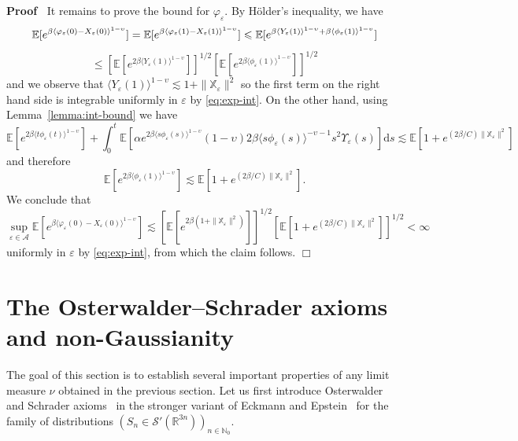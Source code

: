 \documentclass[a4paper,11pt]{article}
\newcommand{\mathd}{\mathrm{d}}
\newcommand{\tmcolor}[2]{{\color{#1}{#2}}}
\newenvironment{proof}{\noindent\textbf{Proof\ }}{\hspace*{\fill}$\Box$\medskip}
\numberwithin{equation}{section}
\begin{document}
\begin{proof}
  It remains to prove the bound for $\varphi_{\varepsilon}$. By H{\"o}lder's inequality, we have
  \[ \mathbb{E} [e^{\beta \langle \varphi_{\varepsilon} (0) - X_{\varepsilon}
     (0) \rangle^{1 - \upsilon}}] =\mathbb{E} [e^{\beta \langle
     \varphi_{\varepsilon} (1) - X_{\varepsilon} (1) \rangle^{1 - \upsilon}}]
     \leqslant \mathbb{E} [e^{ \beta \tmcolor{red}{} \langle Y_{\varepsilon}
     (1) \rangle^{1 - \upsilon} +  \beta \tmcolor{red}{} \langle
     \phi_{\varepsilon} (1) \rangle^{1 - \upsilon}}] \]
  \[ \leqslant [\mathbb{E} [e^{2  \beta \langle Y_{\varepsilon} (1)
     \rangle^{1 - \upsilon}}]]^{1 / 2} [\mathbb{E} [e^{2 \beta  \langle
     \phi_{\varepsilon} (1) \rangle^{1 - \upsilon}}]]^{1 / 2} \]
  and we observe that $\langle Y_{\varepsilon} (1) \rangle^{1 - \upsilon}
  \lesssim 1 + \| \mathbb{X}_{\varepsilon} \|^2$ so the first term on the
  right hand side is integrable uniformly in $\varepsilon$ by {\eqref{eq:exp-int}}. On
  the other hand, using Lemma~\ref{lemma:int-bound} we have
  \[ \mathbb{E} [e^{2  \beta \langle t \phi_{\varepsilon} (t) \rangle^{1 -
     \upsilon}}] + \int_0^t \mathbb{E} [\alpha e^{2  \beta \langle s
     \phi_{\varepsilon} (s) \rangle^{1 - \upsilon}} (1-\upsilon)2\beta \langle s
     \phi_{\varepsilon} (s) \rangle^{- \upsilon - 1} s^2
     \Upsilon_{\varepsilon} (s)] \mathd s \lesssim \mathbb{E} [1 + e^{(2 \beta
     / C) \| \mathbb{X}_{\varepsilon} \|^2}] \]
  and therefore
  \[ \mathbb{E} [e^{2  \beta \langle \phi_{\varepsilon} (1) \rangle^{1 -
     \upsilon}}] \lesssim \mathbb{E} [1 + e^{(2 \beta / C) \|
     \mathbb{X}_{\varepsilon} \|^2}] . \]
  We conclude that
  \[ \sup_{\varepsilon\in\mathcal A}\mathbb{E} [e^{\beta \langle \varphi_{\varepsilon} (0) - X_{\varepsilon}
     (0) \rangle^{1 - \upsilon}}] \lesssim [\mathbb{E} [e^{2 \beta  (1+\|\mathbb X_{\varepsilon}\|^{2})}]]^{1 / 2} [\mathbb{E} [1 +
     e^{(2 \beta / C) \| \mathbb{X}_{\varepsilon} \|^2}]]^{1 / 2} < \infty \]
  uniformly in $\varepsilon$ by {\eqref{eq:exp-int}}, from which the claim
   follows.
\end{proof}



\section{The Osterwalder--Schrader axioms and non-Gaussianity}\label{s:ax}

The goal of this section is to establish several important properties of any
limit measure $\nu$ obtained in the previous section. 
Let us first introduce Osterwalder and
Schrader axioms~{\cite{osterwalder_axioms_1973,osterwalder_axioms_1975}} in the stronger variant of Eckmann and Epstein~\cite{eckmann_time_ordered_1979} for the family of distributions $(S_n \in \mathcal{S}'
(\mathbb{R}^{3n}))_{n \in\mathbb{N}_{0}}$.
\end{document}

